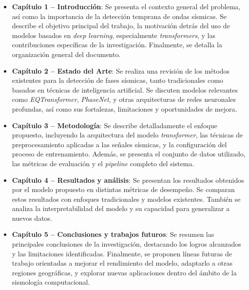 \begin{itemize}
    \item \textbf{Capítulo 1 – Introducción}: Se presenta el contexto general del problema, así como la importancia de la detección temprana de ondas sísmicas. Se describe el objetivo principal del trabajo, la motivación detrás del uso de modelos basados en \textit{deep learning}, especialmente \textit{transformers}, y las contribuciones específicas de la investigación. Finalmente, se detalla la organización general del documento.

    \item \textbf{Capítulo 2 – Estado del Arte}: Se realiza una revisión de los métodos existentes para la detección de fases sísmicas, tanto tradicionales como basados en técnicas de inteligencia artificial. Se discuten modelos relevantes como \textit{EQTransformer}, \textit{PhaseNet}, y otras arquitecturas de redes neuronales profundas, así como sus fortalezas, limitaciones y oportunidades de mejora.

    \item \textbf{Capítulo 3 – Metodología}: Se describe detalladamente el enfoque propuesto, incluyendo la arquitectura del modelo \textit{transformer}, las técnicas de preprocesamiento aplicadas a las señales sísmicas, y la configuración del proceso de entrenamiento. Además, se presenta el conjunto de datos utilizado, las métricas de evaluación y el \textit{pipeline} completo del sistema.

    \item \textbf{Capítulo 4 – Resultados y análisis}: Se presentan los resultados obtenidos por el modelo propuesto en distintas métricas de desempeño. Se comparan estos resultados con enfoques tradicionales y modelos existentes. También se analiza la interpretabilidad del modelo y su capacidad para generalizar a nuevos datos.

    \item \textbf{Capítulo 5 – Conclusiones y trabajos futuros}: Se resumen las principales conclusiones de la investigación, destacando los logros alcanzados y las limitaciones identificadas. Finalmente, se proponen líneas futuras de trabajo orientadas a mejorar el rendimiento del modelo, adaptarlo a otras regiones geográficas, y explorar nuevas aplicaciones dentro del ámbito de la sismología computacional.
\end{itemize}
